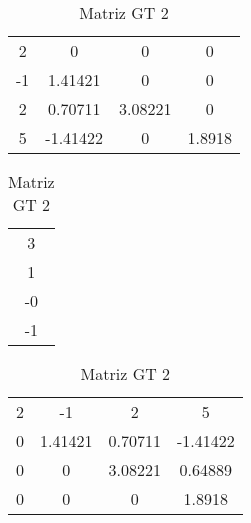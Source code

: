 \documentclass[12pt]{article}
\begin{document}
\begin{table}[!ht]
  \begin{minipage}[b]{.36\linewidth}

    \centering
    \begin{tabular}{|c c c c|}
        2           &         0                   &           0             &   0     \\
        -1          &         1.41421            &          0               &   0     \\
        2           &         0.70711           &          3.08221                &   0 \\
        5          &         -1.41422            &           0          &   1.8918  \\
    \end{tabular}
    \caption{Matriz G 2}
    \label{tab:dir}


  \end{minipage}\hfill
  \begin{minipage}[b]{.46\linewidth}

    \centering
    \begin{tabular}{|c|}
        3\\
        1\\
        -0\\
        -1\\
    \end{tabular}
    \caption{Resolução Matriz 2}
    \label{tab:dir}
  \end{minipage}\hfill
  \begin{minipage}[b]{.36\linewidth}

    \centering
    \begin{tabular}{|c c c c|}
        2                 &         -1       &           2             &   5    \\
        0          &        1.41421          &          0.70711        &   -1.41422      \\
        0           &         0               &         3.08221      &   0.64889     \\
        0          &         0                &           0             &   1.8918    \\
    \end{tabular}
      \caption{Matriz GT 2}
    \label{tab:esq}
  \end{minipage}

\end{table}
\end{document}
